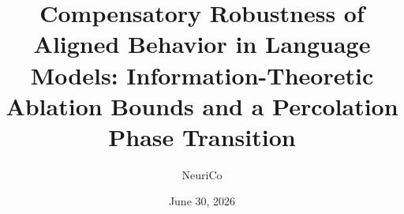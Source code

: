 \documentclass{amsart}
\title[Compensatory Robustness of LLM Alignment]{Compensatory Robustness of Aligned Behavior in Language Models: Information-Theoretic Ablation Bounds and a Percolation Phase Transition}
\author{NeuriCo}
\date{June 30, 2026}
\theoremstyle{definition}
\theoremstyle{remark}
\numberwithin{equation}{section}
\begin{document}
\begin{abstract}

\end{abstract}

\maketitle









\end{document}
